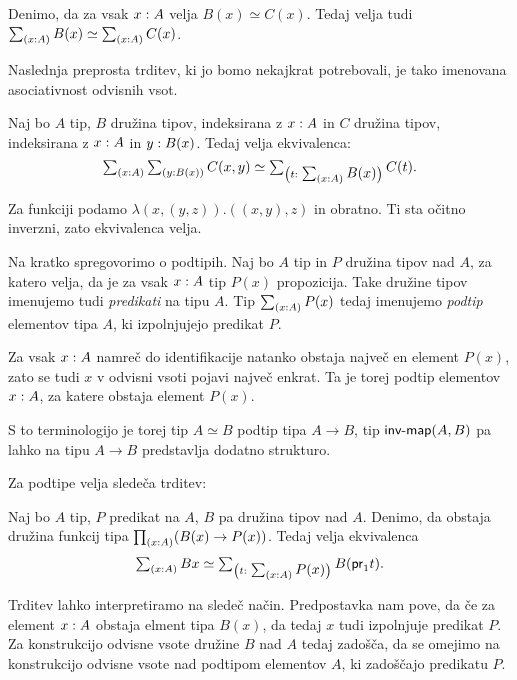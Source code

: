 \begin{posledica}
  \label{equiv-tot}
  Denimo, da za vsak \(x : A\) velja \(B(x) \simeq C(x)\). Tedaj velja tudi \(\textstyle \sum_{\left( x : A \right)} B(x) \simeq \textstyle \sum_{\left( x : A \right)} C(x)\).
\end{posledica}

Naslednja preprosta trditev, ki jo bomo nekajkrat potrebovali, je tako imenovana asociativnost odvisnih vsot.

\begin{trditev}
  \label{sigma-assoc}
  Naj bo \(A\) tip, \(B\) družina tipov, indeksirana z \(x : A\) in \(C\) družina tipov, indeksirana z \(x : A\) in \(y : B(x)\).
  Tedaj velja ekvivalenca:
  \[\textstyle \sum_{\left( x : A \right)} \textstyle \sum_{\left( y : B(x) \right)} C(x, y) \simeq
    \textstyle \sum_{\left( t : \textstyle \sum_{\left( x : A \right)} B(x) \right)} C(t).\]
\end{trditev}

\begin{dokaz}
  Za funkciji podamo \(\lambda (x, (y, z)).((x, y), z)\) in obratno. Ti sta očitno inverzni, zato ekvivalenca velja.
\end{dokaz}

Na kratko spregovorimo o podtipih. Naj bo \(A\) tip in \(P\) družina tipov nad \(A\), za katero velja, da je za vsak \(x : A\) tip \(P(x)\) propozicija. Take družine tipov imenujemo tudi \emph{predikati} na tipu \(A\). Tip \(\textstyle \sum_{\left( x : A \right)} P(x)\) tedaj imenujemo \emph{podtip} elementov tipa \(A\), ki izpolnjujejo predikat \(P\).

Za vsak \(x : A\) namreč do identifikacije natanko obstaja največ en element \(P(x)\), zato se tudi \(x\) v odvisni vsoti pojavi največ enkrat. Ta je torej podtip elementov \(x : A\), za katere obstaja element \(P(x)\).

S to terminologijo je torej tip \(A \simeq B\) podtip tipa \(A \to B\), tip \(\textnormal{\textsf{inv-map}}(A, B)\) pa lahko na tipu \(A \to B\) predstavlja dodatno strukturo.

Za podtipe velja sledeča trditev:

\begin{trditev}
  \label{full-subtype}
  Naj bo \(A\) tip, \(P\) predikat na \(A\), \(B\) pa družina tipov nad \(A\).
  Denimo, da obstaja družina funkcij tipa \(\textstyle \prod_{\left( x : A \right)} (B(x) \to P(x))\).
  Tedaj velja ekvivalenca
  \[\textstyle \sum_{\left( x : A \right)} Bx \simeq \textstyle \sum_{\left( t : \textstyle \sum_{\left( x : A \right)} P(x) \right)} B (\textnormal{\textsf{pr}}_{1} t).\]
\end{trditev}

Trditev lahko interpretiramo na sledeč način. Predpostavka nam pove, da če za element \(x : A\) obstaja elment tipa \(B(x)\), da tedaj \(x\) tudi izpolnjuje predikat \(P\). Za konstrukcijo odvisne vsote družine \(B\) nad \(A\) tedaj zadošča, da se omejimo na konstrukcijo odvisne vsote nad podtipom elementov \(A\), ki zadoščajo predikatu \(P\).

